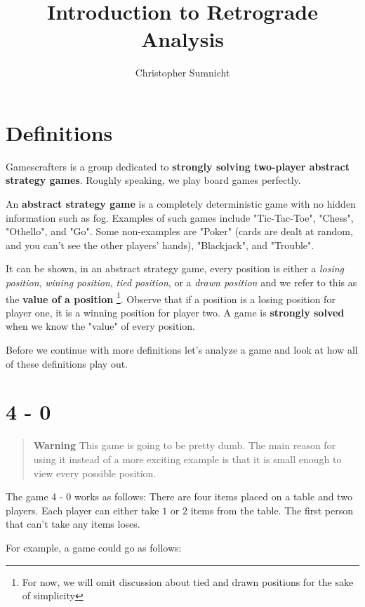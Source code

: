 \documentclass[a4paper]{article}
\begin{document}
\title{Introduction to Retrograde Analysis}
\author{Christopher Sumnicht}
\maketitle

\section{Definitions}

Gamescrafters is a group dedicated to \textbf{strongly solving two-player abstract strategy games}. Roughly speaking, we play board games perfectly.

An \textbf{abstract strategy game} is a completely deterministic game with no hidden information such as fog. Examples of such games include "Tic-Tac-Toe", "Chess", "Othello", and "Go". Some non-examples are "Poker" (cards are dealt at random, and you can't see the other players' hands), "Blackjack", and "Trouble". 

It can be shown, in an abstract strategy game, every position is either a \textit{losing position}, \textit{wining position}, \textit{tied position}, or a \textit{drawn position} and we refer to this as the \textbf{value of a position} \footnote{For now, we will omit discussion about tied and drawn positions for the sake of simplicity}. Observe that if a position is a losing position for player one, it is a winning position for player two. A game is \textbf{strongly solved} when we know the "value" of every position.

Before we continue with more definitions let's analyze a game and look at how all of these definitions play out.

\section{ 4 - 0 }

\begin{quote}
    \textbf{Warning} This game is going to be pretty dumb. The main reason for using it instead of a more exciting example is that it is small enough to view every possible position.
\end{quote}

The game 4 - 0 works as follows: There are four items placed on a table and two players. Each player can either take $1$ or $2$ items from the table. The first person that can't take any items loses.

For example, a game could go as follows:
\end{document}
